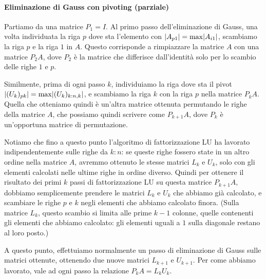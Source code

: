 \documentclass[a4paper]{report}
\DeclarePairedDelimiter{\abs}{\lvert}{\rvert}
\theoremstyle{definiton}
\theoremstyle{remark}
\begin{document}
\paragraph{Eliminazione di Gauss con pivoting (parziale)}

Partiamo da una matrice $P_1 = I$. Al primo passo dell'eliminazione di Gauss, una volta individuata la riga $p$ dove sta l'elemento con $\abs{A_{p1}} = \max \abs{A_{i1}}$, scambiamo la riga $p$ e la riga $1$ in $A$. Questo corrisponde a rimpiazzare la matrice $A$ con una matrice $P_2A$, dove $P_2$ è la matrice che differisce dall'identità solo per lo scambio delle righe $1$ e $p$.

Similmente, prima di ogni passo $k$, individuiamo la riga dove sta il pivot $\abs{(U_k)_{pk}} = \max \abs{(U_k)_{k:n,k}}$, e scambiamo la riga $k$ con la riga $p$ nella matrice $P_k A$. Quella che otteniamo quindi è un'altra matrice ottenuta permutando le righe della matrice $A$, che possiamo quindi scrivere come $P_{k+1} A$, dove $P_k$ è un'opportuna matrice di permutazione.

Notiamo che fino a questo punto l'algoritmo di fattorizzazione LU ha lavorato indipendentemente sulle righe da $k:n$: se queste righe fossero state in un altro ordine nella matrice $A$, avremmo ottenuto le stesse matrici $L_k$ e $U_k$, solo con gli elementi calcolati nelle ultime righe in ordine diverso. Quindi per ottenere il risultato dei primi $k$ passi di fattorizzazione LU su questa matrice $P_{k+1} A$, dobbiamo semplicemente prendere le matrici $L_k$ e $U_k$ che abbiamo già calcolato, e scambiare le righe $p$ e $k$ negli elementi che abbiamo calcolato finora. (Sulla matrice $L_k$, questo scambio si limita alle prime $k-1$ colonne, quelle contenenti gli elementi che abbiamo calcolato: gli elementi uguali a $1$ sulla diagonale restano al loro posto.)

A questo punto, effettuiamo normalmente un passo di eliminazione di Gauss sulle matrici ottenute, ottenendo due nuove matrici $L_{k+1}$ e $U_{k+1}$. Per come abbiamo lavorato, vale ad ogni passo la relazione $P_k A = L_k U_k$.
\end{document}
